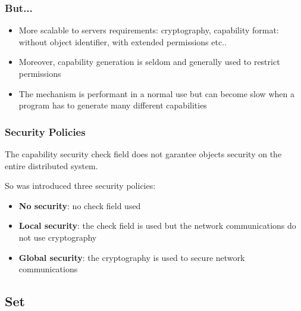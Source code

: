 \documentclass[8pt]{beamer}
\newcommand{\nl}[0]{\vspace{0.4cm}}
\begin{document}

\begin{frame}
  \frametitle{But...}

  \begin{itemize}[<+->]
    \item
      More scalable to servers requirements: cryptography,
      capability format: without object identifier, with extended
      permissions etc..
    \item
      Moreover, capability generation is seldom and generally used
      to restrict permissions
    \item
      The mechanism is performant in a normal use but can become
      slow when a program has to generate many different capabilities
  \end{itemize}
\end{frame}


\begin{frame}
  \frametitle{Security Policies}

  The capability security check field does not garantee objects security on
  the entire distributed system.

  \nl

  So was introduced three security policies:

  \begin{itemize}[<+->]
    \item
      \textbf{No security}: no check field used
    \item
      \textbf{Local security}: the check field is used but the
      network communications do not use cryptography
    \item
      \textbf{Global security}: the cryptography is used to secure
      network communications
  \end{itemize}
\end{frame}

%
%

\subsection{Set}

\end{document}
